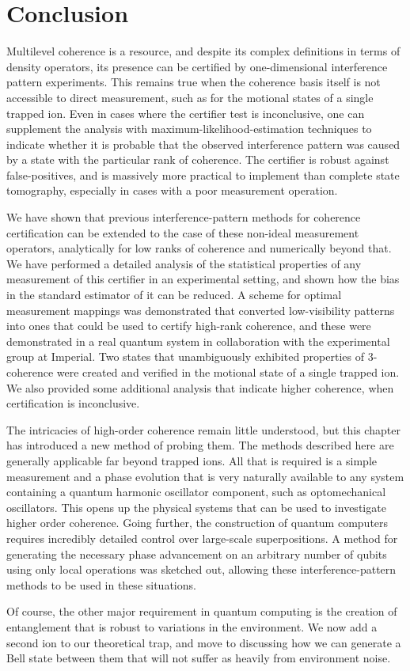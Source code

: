 \section{Conclusion}

Multilevel coherence is a resource, and despite its complex definitions in terms of density operators, its presence can be certified by one-dimensional interference pattern experiments.
This remains true when the coherence basis itself is not accessible to direct measurement, such as for the motional states of a single trapped ion.
Even in cases where the certifier test is inconclusive, one can supplement the analysis with maximum-likelihood-estimation techniques to indicate whether it is probable that the observed interference pattern was caused by a state with the particular rank of coherence.
The certifier is robust against false-positives, and is massively more practical to implement than complete state tomography, especially in cases with a poor measurement operation.

We have shown that previous interference-pattern methods for coherence certification can be extended to the case of these non-ideal measurement operators, analytically for low ranks of coherence and numerically beyond that.
We have performed a detailed analysis of the statistical properties of any measurement of this certifier in an experimental setting, and shown how the bias in the standard estimator of it can be reduced.
A scheme for optimal measurement mappings was demonstrated that converted low-visibility patterns into ones that could be used to certify high-rank coherence, and these were demonstrated in a real quantum system in collaboration with the experimental group at Imperial.
Two states that unambiguously exhibited properties of 3-coherence were created and verified in the motional state of a single trapped ion.
We also provided some additional analysis that indicate higher coherence, when certification is inconclusive.

The intricacies of high-order coherence remain little understood, but this chapter has introduced a new method of probing them.
The methods described here are generally applicable far beyond trapped ions.
All that is required is a simple measurement and a phase evolution that is very naturally available to any system containing a quantum harmonic oscillator component, such as optomechanical oscillators.
This opens up the physical systems that can be used to investigate higher order coherence.
Going further, the construction of quantum computers requires incredibly detailed control over large-scale superpositions.
A method for generating the necessary phase advancement on an arbitrary number of qubits using only local operations was sketched out, allowing these interference-pattern methods to be used in these situations.

Of course, the other major requirement in quantum computing is the creation of entanglement that is robust to variations in the environment.
We now add a second ion to our theoretical trap, and move to discussing how we can generate a Bell state between them that will not suffer as heavily from environment noise.
